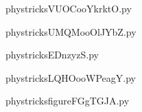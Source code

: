     

    \clearpage
    


    \newcommand{\CaptionFigVUOCooYkrktO}{<+Type your caption here+>}
    \begin{center}
        
    \end{center}
    phystricksVUOCooYkrktO.py

    

    \clearpage
    


    \newcommand{\CaptionFigUMQMooOlJYbZ}{<+Type your caption here+>}
    \begin{center}
        
    \end{center}
    phystricksUMQMooOlJYbZ.py

    

    \clearpage
    


    \newcommand{\CaptionFigEDnzyzS}{<+Type your caption here+>}
    \begin{center}
        
    \end{center}
    phystricksEDnzyzS.py

    

    \clearpage
    


    \newcommand{\CaptionFigLQHOooWPeagY}{<+Type your caption here+>}
    \begin{center}
        
    \end{center}
    phystricksLQHOooWPeagY.py

    

    \clearpage
    


    \newcommand{\CaptionFigfigureFGgTGJA}{<+Type your caption here+>}
    \begin{center}
        
    \end{center}
    phystricksfigureFGgTGJA.py

    

    \clearpage
    


